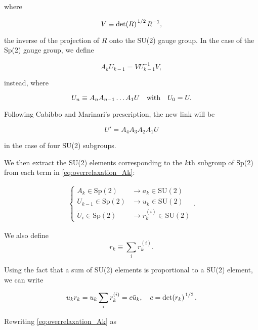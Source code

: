 \documentclass[reqno,12pt]{article}
\numberwithin{equation}{section}
\newcommand{\SU}{\mathrm{SU}}
\newcommand{\Sp}{\mathrm{Sp}}
\begin{document}
where 

\begin{equation}
	V \equiv \det(R)^{\flatfrac{1}{2}} R^{-1},
\end{equation}

the inverse of the projection of $R$ onto the SU(2) gauge group. In the case of the Sp(2) gauge group, 
we define 

\begin{equation} \label{eq:overrelaxation_Ak}
	A_k U_{k-1} = V U_{k-1}^{-1} V,
\end{equation}

instead, where 

\begin{equation}
	U_{n} \equiv A_n A_{n-1} \dots A_1 U \qq{with} U_0 = U.
\end{equation}

Following Cabibbo and Marinari's prescription, the new link will be

\begin{equation} \label{eq:overrelaxation_newlink}
	U' = A_4 A_3 A_2 A_1 U
\end{equation}

in the case of four SU(2) subgroups.

We then extract the SU(2) elements corresponding to the $k$th subgroup of Sp(2) 
from each term in \eqref{eq:overrelaxation_Ak}:

\begin{eqnarray}
	\begin{cases}
		A_k \in \Sp(2) &\longrightarrow a_k \in \SU(2) \\
		U_{k-1} \in \Sp(2) &\longrightarrow u_k \in \SU(2) \\
		\widetilde{U}_i \in \Sp(2) &\longrightarrow r_k^{(i)} \in \SU(2)
	\end{cases}.
\end{eqnarray}

We also define
\begin{equation}
	r_k \equiv \sum_i r_k^{(i)}.
\end{equation}

Using the fact that a sum of SU(2) elements is proportional to a SU(2) element, we can write

\begin{equation}
	u_k r_k = u_k \sum_i r_k^{(i)} = c \bar{u}_k \qc c = \det(r_k)^{\flatfrac{1}{2}}.
\end{equation}

Rewriting \eqref{eq:overrelaxation_Ak} as
\end{document}
